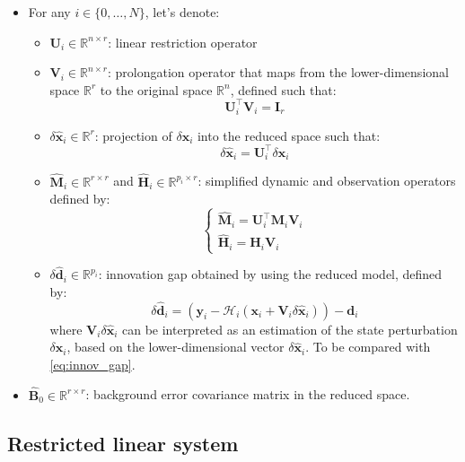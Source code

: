 \documentclass[a4paper,10pt]{article}
\newcommand{\MH}{\mathcal H}
\newcommand{\BB}{{\mathbf B}}
\newcommand{\BH}{{\mathbf H}}
\newcommand{\BM}{{\mathbf M}}
\newcommand{\BU}{{\mathbf U}}
\newcommand{\BV}{{\mathbf V}}
\newcommand{\BI}{{\mathbf I}}
\newcommand{\bx}{{\boldsymbol x}}
\newcommand{\by}{{\boldsymbol y}}
\newcommand{\bd}{{\boldsymbol d}}
\newcommand{\hx}{\hat \bx}
\newcommand{\hd}{\hat \bd}
\newcommand{\HM}{\hat \BM}
\newcommand{\HH}{\hat \BH}
\newcommand{\HB}{\hat \BB}
\newcommand{\dx}{\delta \bx}
\newcommand{\dhx}{\delta \hx}
\newcommand{\dhd}{\delta \hd}
\newcommand{\mathR}{\mathbb{R}}
\newcommand{\izton}{i \in \{0, \dots, N\}}
\begin{document}
\begin{itemize}
	\item For any $\izton$, let's denote:
	\begin{itemize}
		\item $\BU_i \in \mathR^{n \times r}$: linear restriction operator
		
		\item $\BV_i \in \mathR^{n \times r}$: prolongation operator that maps from the lower-dimensional space $\mathR^r$ to the original space $\mathR^n$, defined such that:
		\begin{equation}
		\label{eq:prol_op}
			\BU_i^\top \BV_i = \BI_r
		\end{equation}
		
		\item $\dhx_i \in \mathR^r$: projection of $\dx_i$ into the reduced space such that:
		\begin{equation}
		\label{eq:restr_op}
			\dhx_i = \BU_i^\top \dx_i
		\end{equation}
		
		\item $\HM_i \in \mathR^{r \times r}$ and $\HH_i \in \mathR^{p_i \times r}$: simplified dynamic and observation operators defined by:
		\begin{equation}
		\label{eq:simpl_dyn_obs}
		\begin{cases}
			\HM_i = \BU_i^\top \BM_i \BV_i \\
			\HH_i = \BH_i \BV_i
		\end{cases}
		\end{equation}
		
		\item $\dhd_i \in \mathR^{p_i	}$: innovation gap obtained by using the reduced model, defined by:
		\begin{equation}
		\label{eq:innov_gap_restr}
			\dhd_i = (\by_i - \MH_i(\bx_i + \BV_i \dhx_i)) - \bd_i
		\end{equation}
		where $\BV_i \dhx_i$ can be interpreted as an estimation of the state perturbation $\dx_i$, based on the lower-dimensional vector $\dhx_i$. To be compared with \eqref{eq:innov_gap}.
	\end{itemize}

	\item $\HB_0 \in \mathR^{r \times r}$: background error covariance matrix in the reduced space.
\end{itemize}

\subsection{Restricted linear system}
\end{document}
